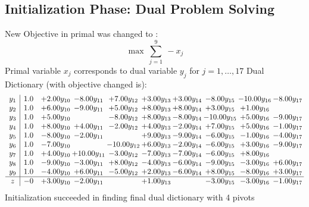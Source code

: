 \documentclass[9pt]{article}
\begin{document}
\subsection{Initialization Phase: Dual Problem Solving}
New Objective in primal was changed to : \[ \max\ \sum_{j=1}^{9}\ - x_j \] 
Primal variable $x_j$ corresponds to dual variable $y_j$ for $j = 1,\ldots,17$
Dual Dictionary (with objective changed is): 
\[\begin{array}{c| c c@{\hskip 2pt} c@{\hskip 2pt} c@{\hskip 2pt} c@{\hskip 2pt} c@{\hskip 2pt} c@{\hskip 2pt} c@{\hskip 2pt} c@{\hskip 2pt} }
 y_{1}   &  1.0 & +  2.00 y_{10} & -8.00 y_{11} & +  7.00 y_{12} & +  3.00 y_{13} & +  3.00 y_{14} & -8.00 y_{15} & -10.00 y_{16} & -8.00 y_{17}\\
 y_{2}   &  1.0 & +  6.00 y_{10} & -9.00 y_{11} & +  5.00 y_{12} & +  8.00 y_{13} & +  8.00 y_{14} & +  3.00 y_{15} & +  1.00 y_{16} &   \\
 y_{3}   &  1.0 & +  5.00 y_{10} &   & -8.00 y_{12} & +  8.00 y_{13} & -8.00 y_{14} & -10.00 y_{15} & +  5.00 y_{16} & -9.00 y_{17}\\
 y_{4}   &  1.0 & +  8.00 y_{10} & +  4.00 y_{11} & -2.00 y_{12} & +  4.00 y_{13} & -2.00 y_{14} & +  7.00 y_{15} & +  5.00 y_{16} & -1.00 y_{17}\\
 y_{5}   &  1.0 & -8.00 y_{10} & -2.00 y_{11} &   & +  9.00 y_{13} & -9.00 y_{14} & -6.00 y_{15} & -1.00 y_{16} & -4.00 y_{17}\\
 y_{6}   &  1.0 & -7.00 y_{10} &   & -10.00 y_{12} & +  6.00 y_{13} & -2.00 y_{14} & -6.00 y_{15} & +  3.00 y_{16} & -9.00 y_{17}\\
 y_{7}   &  1.0 & +  4.00 y_{10} & + 10.00 y_{11} & -3.00 y_{12} & -7.00 y_{13} & -7.00 y_{14} & -6.00 y_{15} & +  8.00 y_{16} &   \\
 y_{8}   &  1.0 & -9.00 y_{10} & -3.00 y_{11} & +  8.00 y_{12} & -4.00 y_{13} & -6.00 y_{14} & -9.00 y_{15} & -3.00 y_{16} & +  6.00 y_{17}\\
 y_{9}   &  1.0 & -4.00 y_{10} & +  6.00 y_{11} & -5.00 y_{12} & +  2.00 y_{13} & -6.00 y_{14} & +  8.00 y_{15} & -8.00 y_{16} & +  3.00 y_{17}\\
\hline
z    &  -0 & +  3.00 y_{10} & -2.00 y_{11} &   & +  1.00 y_{13} &   & -3.00 y_{15} & -3.00 y_{16} & -1.00 y_{17}\\
\end{array}\]
Initialization succeeded in finding final dual dictionary with 4 pivots
\end{document}
